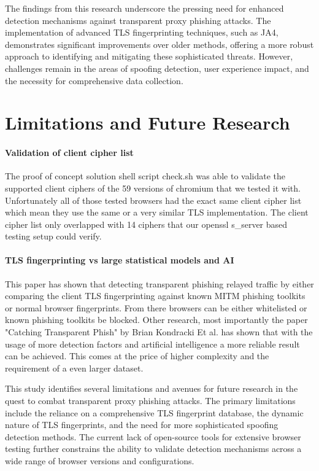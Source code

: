 \documentclass[12pt]{scrbook}
\begin{document}
The findings from this research underscore the pressing need for enhanced detection mechanisms against transparent proxy phishing attacks. The implementation of advanced TLS fingerprinting techniques, such as JA4, demonstrates significant improvements over older methods, offering a more robust approach to identifying and mitigating these sophisticated threats. However, challenges remain in the areas of spoofing detection, user experience impact, and the necessity for comprehensive data collection.


\section{Limitations and Future Research}

\paragraph{Validation of client cipher list}
The proof of concept solution shell script check.sh was able to validate the
supported client ciphers of the 59 versions of chromium that we tested it with.
Unfortunately all of those tested browsers had the exact same client cipher list
which mean they use the same or a very similar TLS implementation. The client cipher list only
overlapped with 14 ciphers that our openssl s\_server based testing setup could
verify.

\paragraph{TLS fingerprinting vs large statistical models and AI}
This paper has shown that detecting transparent phishing relayed traffic by either
comparing the client TLS fingerprinting against known MITM phishing toolkits or normal browser fingerprints.
From there browsers can be either whitelisted or known phishing toolkits be blocked.
Other research, most importantly the paper "Catching Transparent Phish" by Brian Kondracki Et al. has shown
that with the usage of more detection factors and artificial intelligence a more reliable result can be achieved.
This comes at the price of higher complexity and the requirement of a even larger dataset.

This study identifies several limitations and avenues for future research in the quest to combat transparent proxy phishing attacks. The primary limitations include the reliance on a comprehensive TLS fingerprint database, the dynamic nature of TLS fingerprints, and the need for more sophisticated spoofing detection methods. The current lack of open-source tools for extensive browser testing further constrains the ability to validate detection mechanisms across a wide range of browser versions and configurations.

\newpage  
\end{document}
